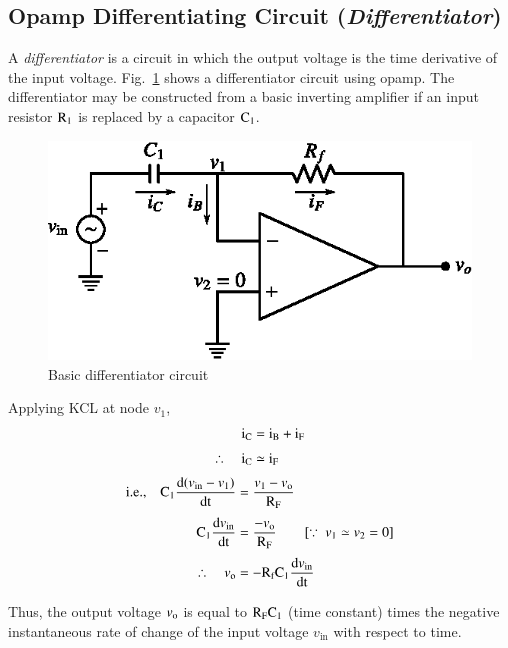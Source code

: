 \subsection{Opamp Differentiating Circuit ({\em Differentiator})}\label{sec4.6.6}

A {\em differentiator} is a circuit in which the output voltage is the time derivative of the input voltage. Fig.~\ref{fig4.14} shows a differentiator circuit using opamp. The differentiator may be constructed from a basic inverting amplifier if an input resistor $\textrm{R}_{1}$ is replaced by a capacitor $\textrm{C}_{1}$.
\begin{figure}[H]
\centering
\includegraphics{chap4/fig4.14.eps}
\caption{Basic differentiator circuit}\label{fig4.14}
\end{figure}

\eject

Applying KCL at node $v_{1}$,
\begin{align}
\textrm{i}_{\textrm{C}} &= \textrm{i}_{\textrm{B}}+\textrm{i}_{\textrm{F}}\notag\\[3pt]
\therefore\quad \textrm{i}_{\textrm{C}} &\simeq \textrm{i}_{\textrm{F}}\label{eq4.50}
\end{align}
\begin{align}
\text{i.e.,}\quad \textrm{C}_{1}\dfrac{\textrm{d} (v_{\text{in}}-v_{1})}{\operatorname{dt}} &= \frac{v_{1}-v_{\textrm{o}}}{\textrm{R}_{\textrm{F}}}\notag\\[3pt]
\textrm{C}_{1}\dfrac{\textrm{d} v_{\text{in}}}{\operatorname{dt}} &=\frac{-v_{\textrm{o}}}{\textrm{R}_{\textrm{F}}}\qquad [\because \ v_{1}\simeq v_{2}=0]\notag\\[3pt]
\therefore\quad v_{\textrm{o}} &= -\textrm{R}_{\textrm{f}}\textrm{C}_{1}\dfrac{\textrm{d} v_{\text{in}}}{\operatorname{dt}}\label{eq4.51}
\end{align}

Thus, the output voltage $v_{\textrm{o}}$ is equal to $\textrm{R}_{\textrm{F}}\textrm{C}_{1}$ (time constant) times the negative instantaneous rate of change of the input voltage $v_{\text{in}}$ with respect to time.

